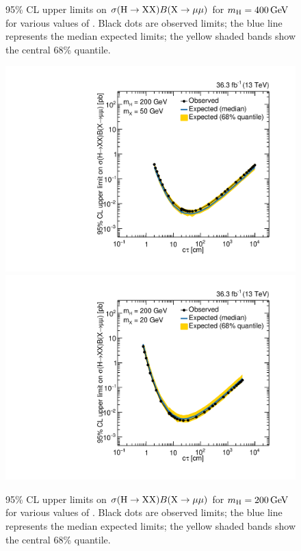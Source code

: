 \begin{figure}[htbp]
  \caption[95\% CL upper limits on $\sigma(\PHiggs\to \PLLP\PLLP)B(\PLLP\to\Pgm\Pgm)$ for $\mH = 400\GeV$ for various values of \mX.]{95\% CL upper limits on $\sigma(\PHiggs\to \PLLP\PLLP)B(\PLLP\to\Pgm\Pgm)$ for $\mH = 400\GeV$ for various values of \mX. Black dots are observed limits; the blue line represents the median expected limits; the yellow shaded bands show the central 68\% quantile.}
  \label{fig:dd:UpperLimits_mH_400}
\end{figure}

\begin{figure}[htbp]
  \centering
  \includegraphics[width=\DSquareWidth]{figures/displaced/Limits_2Mu_200_50_HybridNew.pdf}
  \hspace*{-2em}
  \includegraphics[width=\DSquareWidth]{figures/displaced/Limits_2Mu_200_20_HybridNew.pdf}
  \caption[95\% CL upper limits on $\sigma(\PHiggs\to \PLLP\PLLP)B(\PLLP\to\Pgm\Pgm)$ for $\mH = 200\GeV$ for various values of \mX.]{95\% CL upper limits on $\sigma(\PHiggs\to \PLLP\PLLP)B(\PLLP\to\Pgm\Pgm)$ for $\mH = 200\GeV$ for various values of \mX. Black dots are observed limits; the blue line represents the median expected limits; the yellow shaded bands show the central 68\% quantile.}
  \label{fig:dd:UpperLimits_mH_200}
\end{figure}

